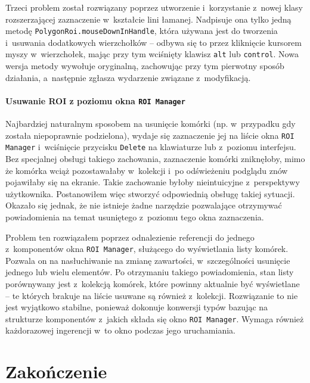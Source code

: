 \documentclass[declaration,shortabstract,mgr]{iithesis}
\begin{document}
Trzeci problem został rozwiązany poprzez utworzenie i~korzystanie z~nowej klasy rozszerzającej zaznaczenie w~kształcie lini łamanej.
Nadpisuje ona tylko jedną metodę \texttt{PolygonRoi.mouseDownInHandle}, która używana jest do tworzenia i~usuwania dodatkowych wierzchołków -- odbywa się to przez kliknięcie kursorem myszy w~wierzchołek, mając przy tym wciśnięty klawisz \texttt{alt} lub \texttt{control}.
Nowa wersja metody wywołuje oryginalną, zachowując przy tym pierwotny sposób działania, a~następnie zgłasza wydarzenie związane z~modyfikacją.

\subsubsection{Usuwanie ROI z poziomu okna \texttt{ROI Manager}}

Najbardziej naturalnym sposobem na usunięcie komórki (np. w~przypadku gdy została niepoprawnie podzielona), wydaje się zaznaczenie jej na liście okna \texttt{ROI Manager} i~wciśnięcie przycisku \texttt{Delete} na klawiaturze lub z~poziomu interfejsu.
Bez specjalnej obsługi takiego zachowania, zaznaczenie komórki zniknęłoby, mimo że komórka wciąż pozostawałaby w~kolekcji i~po odświeżeniu podglądu znów pojawiłaby się na ekranie.
Takie zachowanie byłoby nieintuicyjne z~perspektywy użytkownika.
Postanowiłem więc stworzyć odpowiednią obsługę takiej sytuacji.
Okazało się jednak, że nie istnieje żadne narzędzie pozwalające otrzymywać powiadomienia na temat usuniętego z~poziomu tego okna zaznaczenia.

Problem ten rozwiązałem poprzez odnalezienie referencji do jednego z~komponentów okna \texttt{ROI Manager}, służącego do wyświetlania listy komórek.
Pozwala on na nasłuchiwanie na zmianę zawartości, w~szczególności usunięcie jednego lub wielu elementów.
Po otrzymaniu takiego powiadomienia, stan listy porównywany jest z~kolekcją komórek, które powinny aktualnie być wyświetlane -- te których brakuje na liście usuwane są również z~kolekcji.
Rozwiązanie to nie jest wyjątkowo stabilne, ponieważ dokonuje konwersji typów bazując na strukturze komponentów z~jakich składa się okno \texttt{ROI Manager}.
Wymaga również każdorazowej ingerencji w~to okno podczas jego uruchamiania.



\chapter{Zakończenie}
\end{document}
